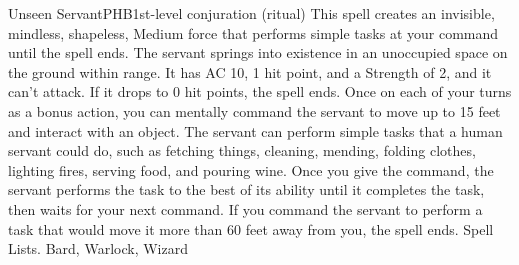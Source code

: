 \begin{spell}{Unseen Servant}{PHB}{1st-level conjuration (ritual)}
{
}
This spell creates an invisible, mindless, shapeless, Medium force that performs simple tasks at your command until the spell ends. The servant springs into existence in an unoccupied space on the ground within range. It has AC 10, 1 hit point, and a Strength of 2, and it can’t attack. If it drops to 0 hit points, the spell ends.
Once on each of your turns as a bonus action, you can mentally command the servant to move up to 15 feet and interact with an object. The servant can perform simple tasks that a human servant could do, such as fetching things, cleaning, mending, folding clothes, lighting fires, serving food, and pouring wine. Once you give the command, the servant performs the task to the best of its ability until it completes the task, then waits for your next command.
If you command the servant to perform a task that would move it more than 60 feet away from you, the spell ends.
Spell Lists. Bard, Warlock, Wizard
\end{spell}

